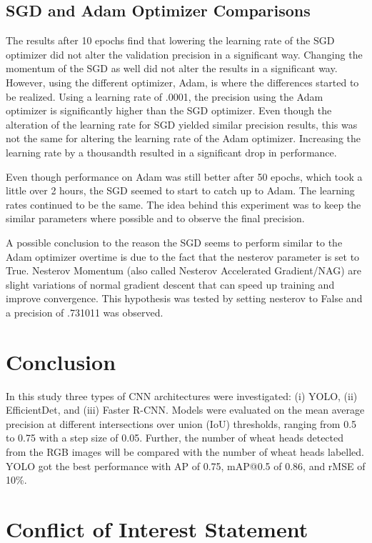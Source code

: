 \documentclass[utf8]{frontiersSCNS} %
\begin{document}
\subsection{SGD and Adam Optimizer Comparisons}

The results after 10 epochs find that lowering the learning rate of the SGD optimizer did not alter the validation precision in a significant way.  Changing the momentum of the SGD as well did not alter the results in a significant way.  However, using the different optimizer, Adam, is where the differences started to be realized.  Using a learning rate of .0001, the precision using the Adam optimizer is significantly higher than the SGD optimizer.
Even though the alteration of the learning rate for SGD yielded similar precision results, this was not the same for altering the learning rate of the Adam optimizer.  Increasing the learning rate by a thousandth resulted in a significant drop in performance.

Even though performance on Adam was still better after 50 epochs, which took a little over 2 hours, the SGD seemed to start to catch up to Adam.  The learning rates continued to be the same.  The idea behind this experiment was to keep the similar parameters where possible and to observe the final precision.  

A possible conclusion to the reason the SGD seems to perform similar to the Adam optimizer overtime is due to the fact that the nesterov parameter is set to True.  Nesterov Momentum (also called Nesterov Accelerated Gradient/NAG) are slight variations of normal gradient descent that can speed up training and improve convergence.  This hypothesis was tested by setting nesterov to False and a precision of .731011 was observed.

\section{Conclusion}
In this study three types of CNN architectures were investigated: (i) YOLO, (ii) EfficientDet, and (iii) Faster R-CNN. Models were evaluated on the mean average precision at different intersections over union (IoU) thresholds, ranging from 0.5 to 0.75 with a step size of 0.05. Further, the number of wheat heads detected from the RGB images will be compared with the number of wheat heads labelled. YOLO got the best performance with AP of 0.75, mAP@0.5 of 0.86, and rMSE of 10\%.

\section*{Conflict of Interest Statement}
\end{document}
